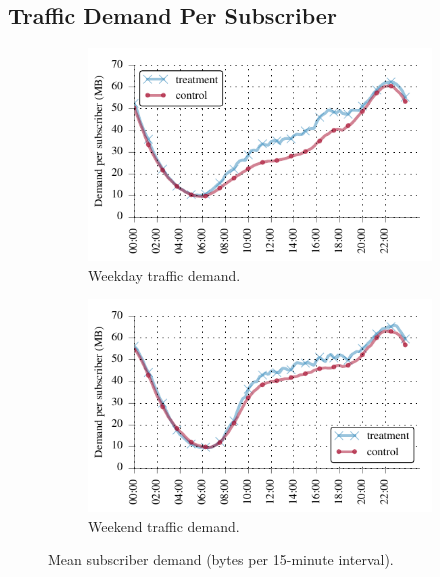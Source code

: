 \subsection{Traffic Demand Per Subscriber}\label{subsec:behavior}

\begin{figure}[t]
\begin{minipage}{1\linewidth}
\centering
%
\begin{subfigure}[b]{1\linewidth}
\includegraphics[width=\linewidth]{figures/weekday_demand_mean.pdf}
               \caption{Weekday traffic demand.\label{fig:weekday-daily-usage}}
\end{subfigure}
%
\begin{subfigure}[b]{1\linewidth}
\includegraphics[width=\linewidth]{figures/weekend_demand_mean.pdf}
               \caption{Weekend traffic demand.\label{fig:weekend-daily-usage}}
\end{subfigure}
%
\end{minipage}
\caption{Mean subscriber demand (bytes per 15-minute interval).}
\label{fig:traffic-demand-timeseries}
\end{figure}


